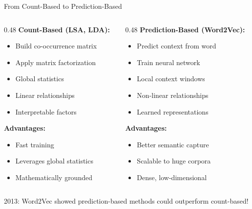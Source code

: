 \documentclass[aspectratio=169]{beamer}
\begin{document}
\begin{frame}[shrink=10]{From Count-Based to Prediction-Based 🎯}
\begin{columns}[T]
\begin{column}{0.48\textwidth}
\textbf{Count-Based (LSA, LDA):}
\begin{itemize}\setlength{\itemsep}{0pt}
    \item Build co-occurrence matrix
    \item Apply matrix factorization
    \item Global statistics
    \item Linear relationships
    \item Interpretable factors
\end{itemize}

\vspace{0.5em}
\textbf{Advantages:}
\begin{itemize}\setlength{\itemsep}{0pt}
    \item Fast training
    \item Leverages global statistics
    \item Mathematically grounded
\end{itemize}
\end{column}

\pause

\begin{column}{0.48\textwidth}
\textbf{Prediction-Based (Word2Vec):}
\begin{itemize}\setlength{\itemsep}{0pt}
    \item Predict context from word
    \item Train neural network
    \item Local context windows
    \item Non-linear relationships
    \item Learned representations
\end{itemize}

\vspace{0.5em}
\textbf{Advantages:}
\begin{itemize}\setlength{\itemsep}{0pt}
    \item Better semantic capture
    \item Scalable to huge corpora
    \item Dense, low-dimensional
\end{itemize}
\end{column}
\end{columns}

\vspace{1em}
\begin{center}
\alert{2013: Word2Vec showed prediction-based methods could outperform count-based!}
\end{center}
\end{frame}
\end{document}
